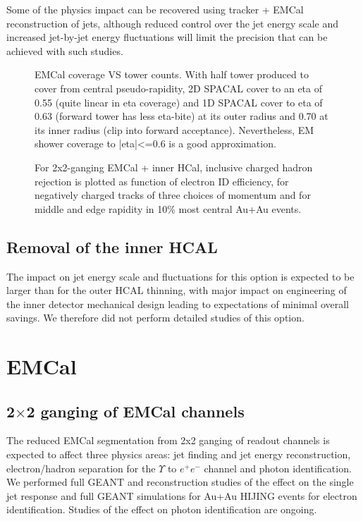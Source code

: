Some of the physics impact can be recovered using tracker + EMCal reconstruction of jets, although reduced control over the jet 
energy scale and increased jet-by-jet energy fluctuations will limit the precision that can be achieved with such studies.

\begin{figure}[hbt]
  \centering
  \caption{EMCal coverage VS tower counts. With half tower produced to cover from central pseudo-rapidity, 2D SPACAL cover to an eta of 0.55 (quite linear in eta coverage) and 1D SPACAL cover to eta of 0.63 (forward tower has less eta-bite) at its outer radius and 0.70 at its inner radius (clip into forward acceptance). Nevertheless, EM shower coverage to |eta|<=0.6 is a good approximation.}
  \label{fig:eta_tower_fraction}
\end{figure}

\begin{figure}[hbt]
  \centering
  \caption{For 2x2-ganging EMCal + inner HCal, inclusive charged
    hadron rejection is plotted as function of electron ID efficiency,
    for negatively charged tracks of three choices of momentum and for
    middle and edge rapidity in 10\% most central Au+Au events.}
  \label{fig:eid_auau}
\end{figure}


\subsection{Removal of the inner HCAL}

The impact on jet energy scale and fluctuations for this option is expected to be larger than for the outer HCAL thinning, 
with major impact on engineering of the inner detector mechanical design leading to expectations of minimal overall savings.
We therefore did not perform detailed studies of this option.

\section{EMCal}
\subsection{2$\times$2 ganging of EMCal channels}
The reduced EMCal segmentation from 2x2 ganging of readout channels is expected to affect three physics areas: jet finding 
and jet energy reconstruction, electron/hadron separation for the $\Upsilon$ to $e^+ e^-$ channel and photon identification.
We performed full GEANT and reconstruction studies of the effect on the single jet response and full GEANT simulations for 
Au+Au HIJING events for electron identification. Studies of the effect on photon identification are ongoing.

